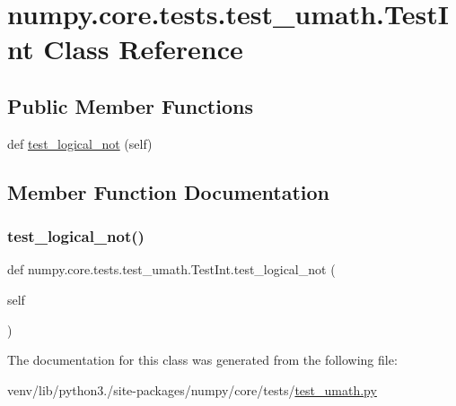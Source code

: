 \hypertarget{classnumpy_1_1core_1_1tests_1_1test__umath_1_1TestInt}{}\section{numpy.\+core.\+tests.\+test\+\_\+umath.\+Test\+Int Class Reference}
\label{classnumpy_1_1core_1_1tests_1_1test__umath_1_1TestInt}
\subsection*{Public Member Functions}
\begin{DoxyCompactItemize}
\item 
def \hyperlink{classnumpy_1_1core_1_1tests_1_1test__umath_1_1TestInt_a0ab4d272e5680634860639ed014fdf74}{test\+\_\+logical\+\_\+not} (self)
\end{DoxyCompactItemize}


\subsection{Member Function Documentation}
\mbox{\label{classnumpy_1_1core_1_1tests_1_1test__umath_1_1TestInt_a0ab4d272e5680634860639ed014fdf74}} 
\subsubsection{\texorpdfstring{test\+\_\+logical\+\_\+not()}{test\_logical\_not()}}
{\footnotesize\ttfamily def numpy.\+core.\+tests.\+test\+\_\+umath.\+Test\+Int.\+test\+\_\+logical\+\_\+not (\begin{DoxyParamCaption}\item[{}]{self }\end{DoxyParamCaption})}



The documentation for this class was generated from the following file\+:\begin{DoxyCompactItemize}
\item 
venv/lib/python3./site-\/packages/numpy/core/tests/\hyperlink{test__umath_8py}{test\+\_\+umath.\+py}\end{DoxyCompactItemize}
